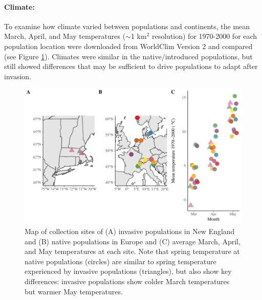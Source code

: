 \documentclass[12pt]{article}\usepackage[]{graphicx}\usepackage[]{color}
\begin{document}
	\paragraph{Climate:} 
	To examine how climate varied between populations and continents, the mean March, April, and May temperatures ($\sim$1 km$^2$ resolution) for 1970-2000 for each population location were downloaded from WorldClim Version 2 \parencite{Fick2017}  and compared (see Figure \ref{fig:sites}). Climates were similar in the native/introduced populations, but still showed differences that may be sufficient to drive populations to adapt after invasion. %
	
	
	\begin{figure} 
		\centering
		\includegraphics[width=1 \textwidth,trim=0cm 0cm 0cm 0cm, angle=0, scale=.9, origin=c,clip=false]{sampling_sites}
		\caption{Map of collection sites of (A) invasive populations in New England and (B) native populations in Europe and (C) average March, April, and May temperatures at each site. Note that spring temperature at native populations (circles) are similar to spring temperature experienced by invasive populations (triangles), but also show key differences: invasive populations show colder March temperatures but warmer May temperatures. } %
		\label{fig:sites}
	\end{figure}
\end{document}
